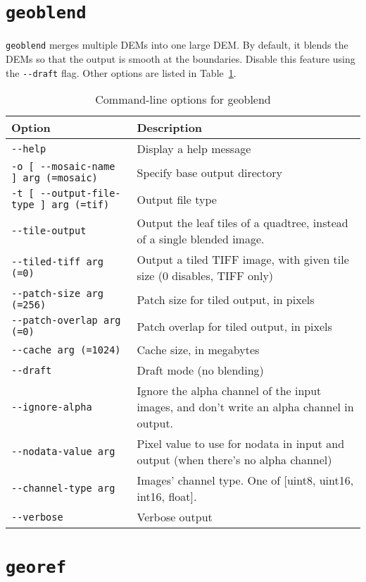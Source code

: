 \section{{\tt geoblend}}\label{sec:geoblend}

\verb#geoblend# merges multiple DEMs into one large DEM.  By default, it blends the DEMs so that the output is smooth at the boundaries.  Disable this feature using the \verb#--draft# flag.  Other options are listed in Table~\ref{tbl:geoblend}.

\begin{table}
\begin{tabular}{|l|l|} \hline
Option & Description \\ \hline \hline
\verb#--help# & Display a help message \\ \hline
\verb#-o [ --mosaic-name ] arg (=mosaic)# & Specify base output directory\\ \hline
\verb#-t [ --output-file-type ] arg (=tif)# & Output file type\\ \hline
\verb#--tile-output# & Output the leaf tiles of a quadtree, instead of a single blended image.\\ \hline
\verb#--tiled-tiff arg (=0)# & Output a tiled TIFF image, with given tile size (0 disables, TIFF only)\\ \hline
\verb#--patch-size arg (=256)# & Patch size for tiled output, in pixels\\ \hline
\verb#--patch-overlap arg (=0)# & Patch overlap for tiled output, in pixels\\ \hline
\verb#--cache arg (=1024)# & Cache size, in megabytes\\ \hline
\verb#--draft# & Draft mode (no blending)\\ \hline
\verb#--ignore-alpha# & Ignore the alpha channel of the input images, and don't write an alpha channel in output.\\ \hline
\verb#--nodata-value arg# & Pixel value to use for nodata in input and output (when there's no alpha channel)\\ \hline
\verb#--channel-type arg# & Images' channel type. One of [uint8, uint16, int16, float].\\ \hline
\verb#--verbose# & Verbose output\\ \hline
\end{tabular}
\caption{Command-line options for geoblend}
\label{tbl:geoblend}
\end{table}

\section{{\tt georef}}\label{sec:georef}

